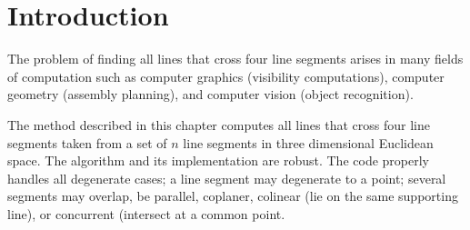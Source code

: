 \newcommand{\reals}{{\rm I\!\hspace{-0.025em} R}}

\def\A{{\cal A}}
\def\S{{\cal S}}

\section{Introduction}

The problem of finding all lines that cross four line segments arises
in many fields of computation such as computer graphics (visibility
computations), computer geometry (assembly planning), and computer
vision (object recognition).

The method described in this chapter computes all lines that cross
four line segments taken from a set of $n$ line segments in three
dimensional Euclidean space. The algorithm and its implementation are
robust. The code properly handles all degenerate cases; a line segment
may degenerate to a point; several segments may overlap, be parallel,
coplaner, colinear (lie on the same supporting line), or concurrent
(intersect at a common point.

